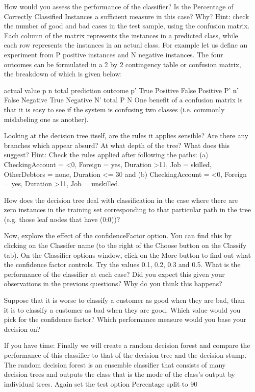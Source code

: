 \documentclass{article}
\begin{document}
How would you assess the performance of the classifier? Is the Percentage of Correctly Classified Instances a sufficient measure in this case? Why? Hint: check the number of good and bad cases in the test sample, using the confusion matrix. Each column of the matrix represents the instances in a predicted class, while each row represents the instances in an actual class. For example let us define an experiment from P positive instances and N negative instances. The four outcomes can be formulated in a 2 by 2 contingency table or confusion matrix, the breakdown of which is given below:

 	actual value
 	p	n	total
prediction
outcome	p'	True
Positive	False
Positive	P'
n'	False
Negative	True
Negative	N'
total	P	N
One benefit of a confusion matrix is that it is easy to see if the system is confusing two classes (i.e. commonly mislabeling one as another).

Looking at the decision tree itself, are the rules it applies sensible? Are there any branches which appear absurd? At what depth of the tree? What does this suggest? 
Hint: Check the rules applied after following the paths: (a) CheckingAccount = <0, Foreign = yes, Duration >11, Job = skilled, OtherDebtors = none, Duration <= 30 and (b) CheckingAccount = <0, Foreign = yes, Duration >11, Job = unskilled.

How does the decision tree deal with classification in the case where there are zero instances in the training set corresponding to that particular path in the tree (e.g. those leaf nodes that have (0:0))?

Now, explore the effect of the confidenceFactor option. You can find this by clicking on the Classifer name (to the right of the Choose button on the Classify tab). On the Classifier options window, click on the More button to find out what the confidence factor controls. Try the values 0.1, 0.2, 0.3 and 0.5. What is the performance of the classifier at each case? Did you expect this given your observations in the previous questions? Why do you think this happens?

Suppose that it is worse to classify a customer as good when they are bad, than it is to classify a customer as bad when they are good. Which value would you pick for the confidence factor? Which performance measure would you base your decision on?

If you have time: Finally we will create a random decision forest and compare the performance of this classifier to that of the decision tree and the decision stump. The random decision forest is an ensemble classifier that consists of many decision trees and outputs the class that is the mode of the class's output by individual trees. Again set the test option Percentage split to 90%
\end{document}
